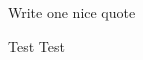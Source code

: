 \clearpage
\begin{center}
    \thispagestyle{empty}
    \vspace*{\fill}
    \epigraph{Write one nice quote}{Test Test}
    \vspace*{\fill}
\end{center}
\clearpage

\newpage
\null
\thispagestyle{empty}
\newpage
